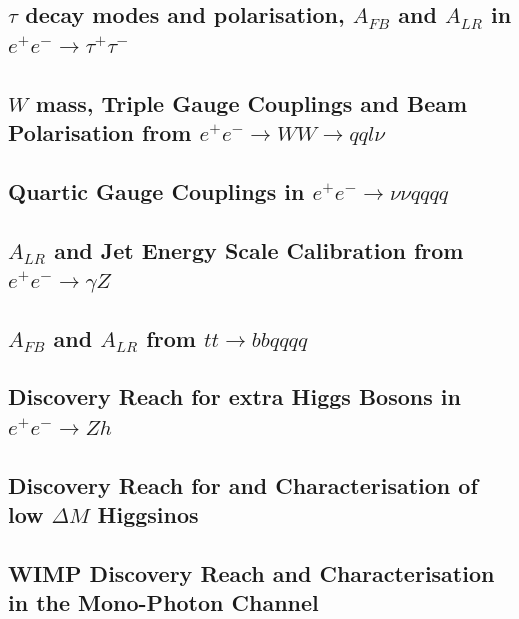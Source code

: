 \subsection{$\tau$ decay modes and polarisation, $A_{FB}$ and $A_{LR}$ in $e^+e^- \to \tau^+\tau^-$}
\subsection{$W$ mass, Triple Gauge Couplings and Beam Polarisation from $e^+e^- \to WW \to qql\nu$}
\subsection{Quartic Gauge Couplings in $e^+e^- \to \nu\nu qqqq$}
\subsection{$A_{LR}$ and Jet Energy Scale Calibration from $e^+e^- \to \gamma Z$}
\subsection{$A_{FB}$ and $A_{LR}$ from $tt \to bb qqqq$}
\subsection{Discovery Reach for extra Higgs Bosons in $e^+e^- \to Zh$}
\subsection{Discovery Reach for and Characterisation of low $\Delta M$ Higgsinos}
\subsection{WIMP Discovery Reach and Characterisation in the Mono-Photon Channel}

